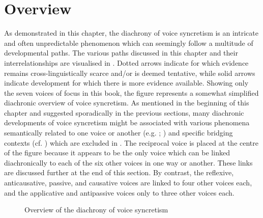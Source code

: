 \section{Overview} \label{diachrony:overview}
As demonstrated in this chapter, the diachrony of voice syncretism is an intricate and often unpredictable phenomenon which can seemingly follow a multitude of developmental paths. The various paths discussed in this chapter and their interrelationships are visualised in . Dotted arrows indicate  for which evidence remains cross-linguistically scarce and/or is deemed tentative, while solid arrows indicate development for which there is more evidence available. Showing only the seven voices of focus in this book, the figure represents a somewhat simplified diachronic overview of voice syncretism. As mentioned in the beginning of this chapter and suggested sporadically in the previous sections, many diachronic developments of voice syncretism might be associated with various phenomena semantically related to one voice or another (e.g. ; ) and specific bridging contexts (cf. \citealt{heine:kuteva:2007}) which are excluded in . The reciprocal voice is placed at the centre of the figure because it appears to be the only voice which can be linked diachronically to each of the six other voices in one way or another. These links are discussed further at the end of this section. By contrast, the reflexive, anticausative, passive, and causative voices are linked to four other voices each, and the applicative and antipassive voices only to three other voices each.

\begin{figure}
	\centering
	\def\svgwidth{\textwidth}
	
	\caption{Overview of the diachrony of voice syncretism}
	\label{fig:ch07:syncretism-diachrony}
\end{figure}

